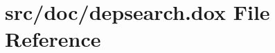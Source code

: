 \hypertarget{depsearch_8dox}{\section{src/doc/depsearch.dox File Reference}
\label{depsearch_8dox}
}

